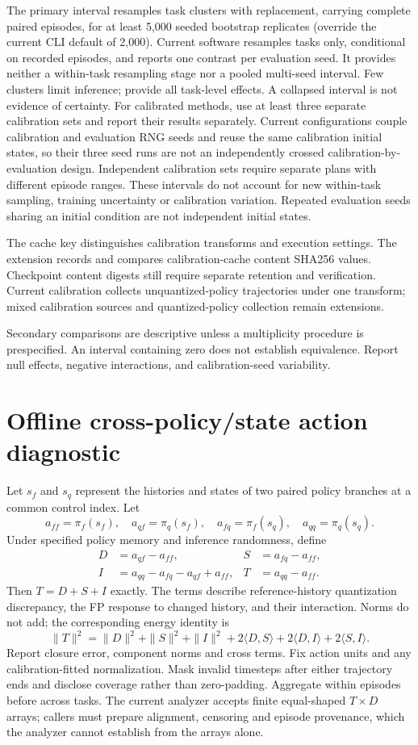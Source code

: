 \documentclass[11pt]{article}
\begin{document}
The primary interval resamples task clusters with replacement, carrying complete
paired episodes, for at least 5,000 seeded bootstrap replicates (override the
current CLI default of 2,000). Current software resamples tasks only, conditional
on recorded episodes, and reports one contrast per evaluation seed. It provides
neither a within-task resampling stage nor a pooled multi-seed interval.
Few clusters limit inference; provide all task-level effects. A collapsed interval
is not evidence of certainty. For calibrated methods, use at least three separate
calibration sets and report their results separately. Current configurations
couple calibration and evaluation RNG seeds and reuse the same calibration
initial states, so their three seed runs are not an independently crossed
calibration-by-evaluation design. Independent calibration sets require separate
plans with different episode ranges. These intervals do not account for new
within-task sampling, training uncertainty or calibration variation. Repeated
evaluation seeds sharing an initial condition are not independent initial states.

The cache key distinguishes calibration transforms and execution settings.
The extension records and compares calibration-cache content SHA256 values.
Checkpoint content digests still require separate retention and verification.
Current calibration collects unquantized-policy trajectories under one transform;
mixed calibration sources and quantized-policy collection remain extensions.

Secondary comparisons are descriptive unless a multiplicity procedure is
prespecified. An interval containing zero does not establish equivalence. Report
null effects, negative interactions, and calibration-seed variability.

\section{Offline cross-policy/state action diagnostic}
Let $s_f$ and $s_q$ represent the histories and states of two paired policy
branches at a common control index. Let
\[
a_{ff}=\pi_f(s_f),\quad a_{qf}=\pi_q(s_f),\quad
a_{fq}=\pi_f(s_q),\quad a_{qq}=\pi_q(s_q).
\]
Under specified policy memory and inference randomness, define
\begin{align}
D &= a_{qf}-a_{ff}, & S &= a_{fq}-a_{ff},\\
I &= a_{qq}-a_{fq}-a_{qf}+a_{ff}, & T &= a_{qq}-a_{ff}.
\end{align}
Then $T=D+S+I$ exactly. The terms describe reference-history quantization
discrepancy, the FP response to changed history, and their interaction. Norms do
not add; the corresponding energy identity is
\[
\|T\|^2=\|D\|^2+\|S\|^2+\|I\|^2
+2\langle D,S\rangle+2\langle D,I\rangle+2\langle S,I\rangle.
\]
Report closure error, component norms and cross terms. Fix action units and any
calibration-fitted normalization. Mask invalid timesteps after either trajectory
ends and disclose coverage rather than zero-padding. Aggregate within episodes
before across tasks. The current analyzer accepts finite equal-shaped $T\times D$
arrays; callers must prepare alignment, censoring and episode provenance, which
the analyzer cannot establish from the arrays alone.
\end{document}
